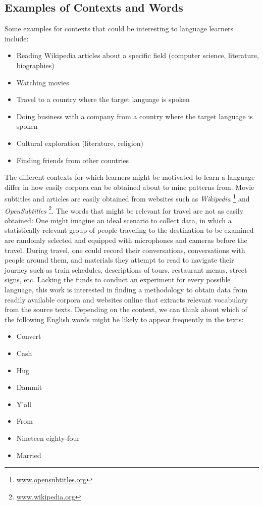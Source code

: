 \subsection{Examples of Contexts and Words}
Some examples for contexts that could be interesting to language learners include:

\begin{itemize}
	\item Reading Wikipedia articles about a specific field (computer science, literature, biographies)
	\item Watching movies
	\item Travel to a country where the target language is spoken
	\item Doing business with a company from a country where the target language is spoken
	\item Cultural exploration (literature, religion)
	\item Finding friends from other countries
\end{itemize}

The different contexts for which learners might be motivated to learn a language differ in how easily corpora can be obtained about to mine patterns from. Movie subtitles and articles are easily obtained from websites such as \textit{Wikipedia} \footnote{\url{www.opensubtitles.org}} and \textit{OpenSubtitles} \footnote{\url{www.wikipedia.org}}. The words that might be relevant for travel are not as easily obtained: One might imagine an ideal scenario to collect data, in which a statistically relevant group of people traveling to the destination to be examined are randomly selected and equipped with microphones and cameras before the travel. During travel, one could record their conversations, conversations with people around them, and materials they attempt to read to navigate their journey such as train schedules, descriptions of tours, restaurant menus, street signs, etc. Lacking the funds to conduct an experiment for every possible language, this work is interested in finding a methodology to obtain data from readily available corpora and websites online that extracts relevant vocabulary from the source texts.
Depending on the context, we can think about which of the following English words might be likely to appear frequently in the texts:

\begin{itemize}
	\item Convert
	\item Cash
	\item Hug
	\item Dammit
	\item Y'all
	\item From
	\item Nineteen eighty-four
	\item Married
\end{itemize}

